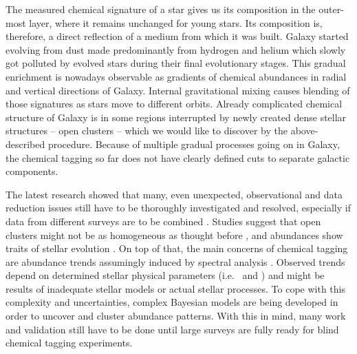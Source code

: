 The measured chemical signature of a star gives us its composition in the outer-most layer, where it remains unchanged for young stars. Its composition is, therefore, a direct reflection of a medium from which it was built. Galaxy started evolving from dust made predominantly from hydrogen and helium which slowly got polluted by evolved stars during their final evolutionary stages. This gradual enrichment is nowadays observable as gradients of chemical abundances in radial and vertical directions of Galaxy. Internal gravitational mixing causes blending of those signatures as stars move to different orbits. Already complicated chemical structure of Galaxy is in some regions interrupted by newly created dense stellar structures -- open clusters -- which we would like to discover by the above-described procedure. Because of multiple gradual processes going on in Galaxy, the chemical tagging so far does not have clearly defined cuts to separate galactic components.

The latest research showed that many, even unexpected, observational and data reduction issues still have to be thoroughly investigated and resolved, especially if data from different surveys are to be combined \cite{2019ARA&A..57..571J}. Studies suggest that open clusters might not be as homogeneous as thought before \cite{2016ApJ...817...49B, 2018MNRAS.473.4612K}, and abundances show traits of stellar evolution \cite{2015A&A...577A..47B, 2017ApJ...840...99D, 2018MNRAS.478..425B}. On top of that, the main concerns of chemical tagging are abundance trends assumingly induced by spectral analysis \cite{2016ApJ...817...49B, 2019arXiv191208539C, 2020arXiv200103179B}. Observed trends depend on determined stellar physical parameters (i.e. \Teff\ and \vsin) and might be results of inadequate stellar models or actual stellar processes. To cope with this complexity and uncertainties, complex Bayesian models are being developed \cite{2016ApJ...817...49B, 2019ApJ...887...73C} in order to uncover and cluster abundance patterns. With this in mind, many work and validation still have to be done until large surveys are fully ready for blind chemical tagging experiments.

